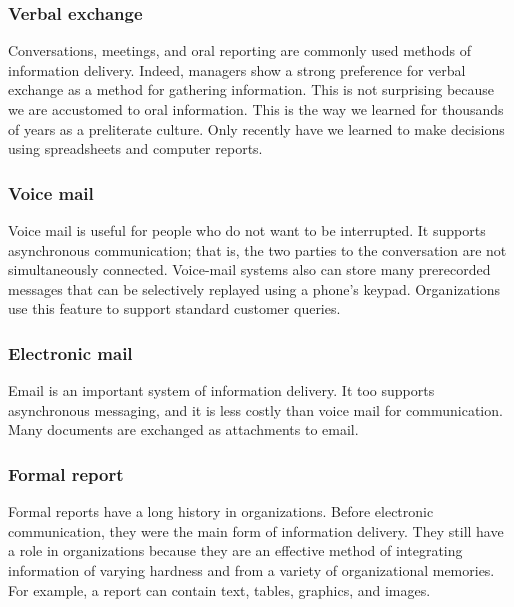 \documentclass[
]{article}
\begin{document}
\hypertarget{verbal-exchange}{%
\subsubsection*{Verbal exchange}\label{verbal-exchange}}

Conversations, meetings, and oral reporting are commonly used methods of
information delivery. Indeed, managers show a strong preference for
verbal exchange as a method for gathering information. This is not
surprising because we are accustomed to oral information. This is the
way we learned for thousands of years as a preliterate culture. Only
recently have we learned to make decisions using spreadsheets and
computer reports.

\hypertarget{voice-mail}{%
\subsubsection*{Voice mail}\label{voice-mail}}

Voice mail is useful for people who do not want to be interrupted. It
supports asynchronous communication; that is, the two parties to the
conversation are not simultaneously connected. Voice-mail systems also
can store many prerecorded messages that can be selectively replayed
using a phone's keypad. Organizations use this feature to support
standard customer queries.

\hypertarget{electronic-mail}{%
\subsubsection*{Electronic mail}\label{electronic-mail}}

Email is an important system of information delivery. It too supports
asynchronous messaging, and it is less costly than voice mail for
communication. Many documents are exchanged as attachments to email.

\hypertarget{formal-report}{%
\subsubsection*{Formal report}\label{formal-report}}

Formal reports have a long history in organizations. Before electronic
communication, they were the main form of information delivery. They
still have a role in organizations because they are an effective method
of integrating information of varying hardness and from a variety of
organizational memories. For example, a report can contain text, tables,
graphics, and images.
\end{document}
